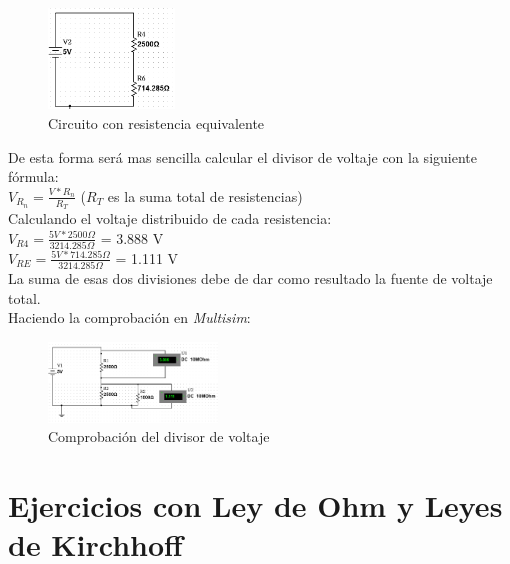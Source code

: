 \documentclass[a4paper,11pt]{article}
\begin{document}
\begin{figure}[H]
    \centering
     \includegraphics[width=0.3\textwidth]{images/equivalente2.PNG}
     \caption{Circuito con resistencia equivalente}
     \label{fig:E}
\end{figure}
\noindent De esta forma será mas sencilla calcular el divisor de voltaje con la siguiente fórmula:
\vspace{0.2cm}\\
$V_{R_n} = \frac{V*R_n}{R_T}$ ($R_T$ es la suma total de resistencias)
\vspace{0.3cm}\\
\noindent Calculando el voltaje distribuido de cada resistencia:
\vspace{0.3cm}\\
$V_{R4}= \frac{5 V * 2500\Omega}{3214.285 \Omega}$ = 3.888 V 
\vspace{0.3cm}\\
$V_{RE}= \frac{5 V * 714.285 \Omega}{3214.285 \Omega}$ = 1.111 V
\vspace{0.3cm}\\
La suma de esas dos divisiones debe de dar como resultado la fuente de voltaje total.
\vspace{0.3cm}\\
\noindent Haciendo la comprobación en \textit{Multisim}:

\begin{figure}[H]
    \centering
     \includegraphics[width=0.4\textwidth]{images/comp.PNG}
     \caption{Comprobación del divisor de voltaje}
     \label{fig:comp}
\end{figure}

\section{Ejercicios con Ley de Ohm y Leyes de Kirchhoff}
\end{document}
